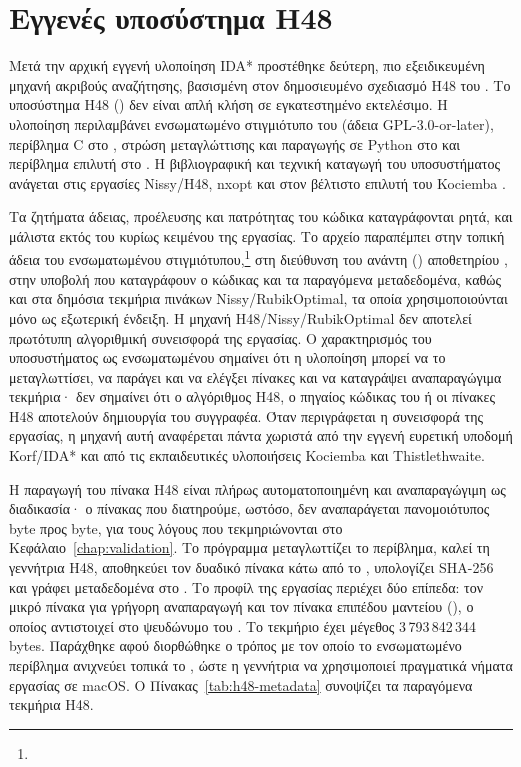 \section{Εγγενές υποσύστημα H48}
\label{sec:implementation-h48}
Μετά την αρχική εγγενή υλοποίηση IDA* προστέθηκε δεύτερη, πιο εξειδικευμένη μηχανή ακριβούς αναζήτησης, βασισμένη στον δημοσιευμένο σχεδιασμό H48 του . Το υποσύστημα H48 () δεν είναι απλή κλήση σε εγκατεστημένο εκτελέσιμο. Η υλοποίηση περιλαμβάνει ενσωματωμένο στιγμιότυπο του  (άδεια GPL-3.0-or-later), περίβλημα C στο , στρώση μεταγλώττισης και παραγωγής σε Python στο  και περίβλημα επιλυτή στο . Η βιβλιογραφική και τεχνική καταγωγή του υποσυστήματος ανάγεται στις εργασίες Nissy/H48, nxopt και στον βέλτιστο επιλυτή του Kociemba \cite{trontoNissyCoreH48,rokickiNxopt,kociembaOptimalSolver}.

Τα ζητήματα άδειας, προέλευσης και πατρότητας του κώδικα καταγράφονται ρητά, και μάλιστα εκτός του κυρίως κειμένου της εργασίας. Το αρχείο  παραπέμπει στην τοπική άδεια του ενσωματωμένου στιγμιότυπου,\footnote{} στη διεύθυνση του ανάντη () αποθετηρίου , στην υποβολή που καταγράφουν ο κώδικας και τα παραγόμενα μεταδεδομένα, καθώς και στα δημόσια τεκμήρια πινάκων Nissy/RubikOptimal, τα οποία χρησιμοποιούνται μόνο ως εξωτερική ένδειξη. Η μηχανή H48/Nissy/RubikOptimal δεν αποτελεί πρωτότυπη αλγοριθμική συνεισφορά της εργασίας. Ο χαρακτηρισμός του υποσυστήματος ως ενσωματωμένου σημαίνει ότι η υλοποίηση μπορεί να το μεταγλωττίσει, να παράγει και να ελέγξει πίνακες και να καταγράψει αναπαραγώγιμα τεκμήρια· δεν σημαίνει ότι ο αλγόριθμος H48, ο πηγαίος κώδικας του  ή οι πίνακες H48 αποτελούν δημιουργία του συγγραφέα. Όταν περιγράφεται η συνεισφορά της εργασίας, η μηχανή αυτή αναφέρεται πάντα χωριστά από την εγγενή ευρετική υποδομή Korf/IDA* και από τις εκπαιδευτικές υλοποιήσεις Kociemba και Thistlethwaite.

Η παραγωγή του πίνακα H48 είναι πλήρως αυτοματοποιημένη και αναπαραγώγιμη ως διαδικασία· ο πίνακας  που διατηρούμε, ωστόσο, δεν αναπαράγεται πανομοιότυπος byte προς byte, για τους λόγους που τεκμηριώνονται στο Κεφάλαιο~\ref{chap:validation}. Το πρόγραμμα  μεταγλωττίζει το περίβλημα, καλεί τη γεννήτρια H48, αποθηκεύει τον δυαδικό πίνακα κάτω από το , υπολογίζει SHA-256 και γράφει μεταδεδομένα στο . Το προφίλ της εργασίας περιέχει δύο επίπεδα: τον μικρό πίνακα  για γρήγορη αναπαραγωγή και τον πίνακα  επιπέδου μαντείου (), ο οποίος αντιστοιχεί στο ψευδώνυμο  του . Το τεκμήριο  έχει μέγεθος 3\,793\,842\,344 bytes. Παράχθηκε αφού διορθώθηκε ο τρόπος με τον οποίο το ενσωματωμένο περίβλημα ανιχνεύει τοπικά το , ώστε η γεννήτρια να χρησιμοποιεί πραγματικά νήματα εργασίας σε macOS. Ο Πίνακας~\ref{tab:h48-metadata} συνοψίζει τα παραγόμενα τεκμήρια H48.

